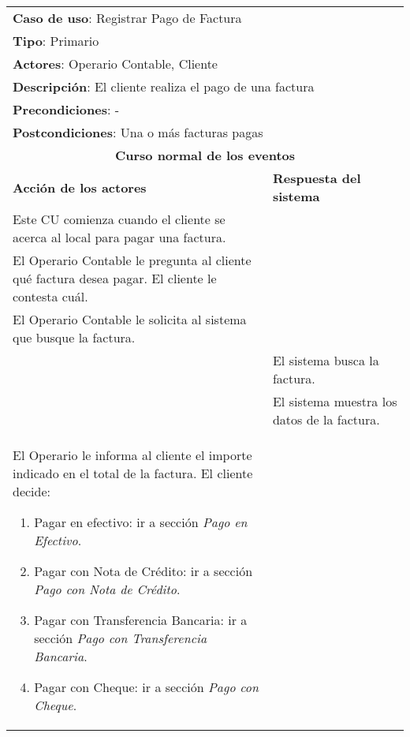 \documentclass[12pt]{extarticle}
\begin{document}
	\begin{longtable}{ |p{8cm}|p{8cm}| }
		\hline
		\multicolumn{2}{|p{16cm}|}{\textbf{Caso de uso}: Registrar Pago de Factura}\\
		\multicolumn{2}{|p{16cm}|}{\textbf{Tipo}: Primario}\\
		\multicolumn{2}{|p{16cm}|}{\textbf{Actores}: Operario Contable, Cliente}\\
		\multicolumn{2}{|p{16cm}|}{\textbf{Descripción}: El cliente realiza el pago de una factura}\\
		\multicolumn{2}{|p{16cm}|}{\textbf{Precondiciones}: -}\\
		\multicolumn{2}{|p{16cm}|}{\textbf{Postcondiciones}: Una o más facturas pagas}\\
		\hline
		\multicolumn{2}{|c|}{\textbf{Curso normal de los eventos}}\\
		\hline
		\textbf{Acción de los actores} & \textbf{Respuesta del sistema}\\
		\hline
			\inc Este CU comienza cuando el cliente se acerca al local para pagar una factura.& \\
            \hline
			\inc El Operario Contable le pregunta al cliente qué factura desea pagar. El cliente le contesta cuál. & \\
            \hline
			\inc El Operario Contable le solicita al sistema que busque la factura. & \\
            \hline
			& \inc El sistema busca la factura. \\
            \hline
			& \inc El sistema muestra los datos de la factura. \\
            \hline
			\inc El Operario le informa al cliente el importe indicado en el total de la factura. El cliente decide:
                \begin{enumerate}[label=(\alph*)]
                    \item Pagar en efectivo: ir a sección \textit{Pago en Efectivo}.
                    \item Pagar con Nota de Crédito: ir a sección \textit{Pago con Nota de Crédito}.
                    \item Pagar con Transferencia Bancaria: ir a sección \textit{Pago con Transferencia Bancaria}.
                    \item Pagar con Cheque: ir a sección \textit{Pago con Cheque}.

\end{enumerate}
\end{longtable}
\end{document}
